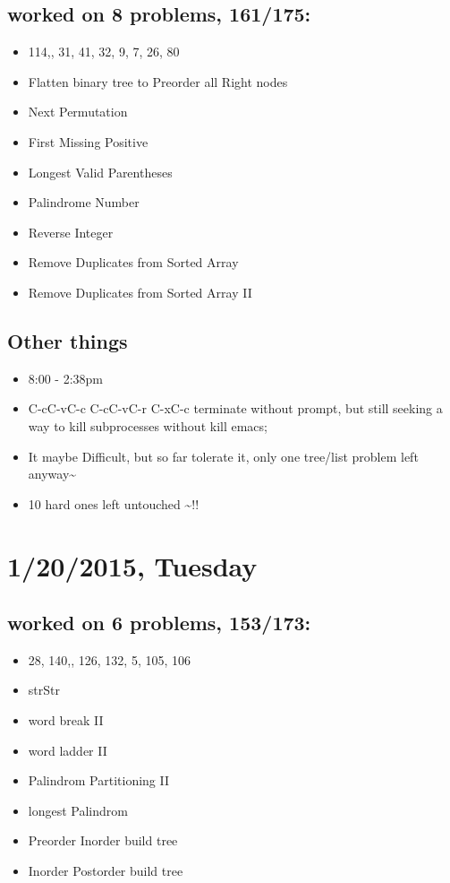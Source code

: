 \documentclass[9pt,b5paper]{article}
\begin{document}
\subsection{worked on 8 problems, 161/175:}
\label{sec-3-1}
\begin{itemize}
\item 114,, 31, 41, 32, 9, 7, 26, 80
\item Flatten binary tree to Preorder all Right nodes
\item Next Permutation
\item First Missing Positive
\item Longest Valid Parentheses
\item Palindrome Number
\item Reverse Integer
\item Remove Duplicates from Sorted Array
\item Remove Duplicates from Sorted Array II
\end{itemize}
\subsection{Other things}
\label{sec-3-2}
\begin{itemize}
\item 8:00 - 2:38pm
\item C-cC-vC-c C-cC-vC-r C-xC-c terminate without prompt, but still seeking a way to kill subprocesses without kill emacs;
\item It maybe Difficult, but so far tolerate it, only one tree/list problem left anyway\textasciitilde{}
\item 10 hard ones left untouched \textasciitilde{}!!
\end{itemize}
\section{1/20/2015, Tuesday}
\label{sec-4}
\subsection{worked on 6 problems, 153/173:}
\label{sec-4-1}
\begin{itemize}
\item 28, 140,, 126, 132, 5, 105, 106
\item strStr
\item word break II
\item word ladder II
\item Palindrom Partitioning II
\item longest Palindrom
\item Preorder Inorder build tree
\item Inorder Postorder build tree
\end{itemize}
\end{document}

